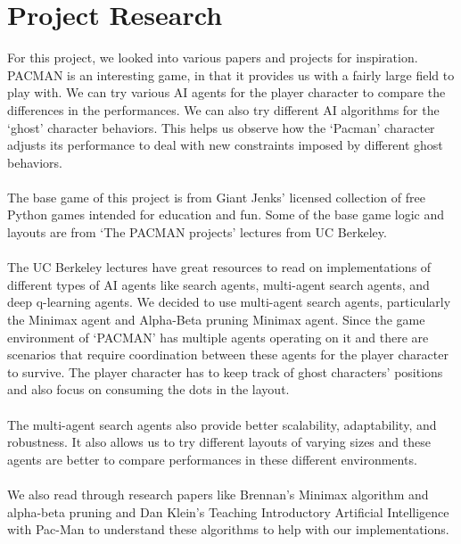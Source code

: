 \documentclass[letterpaper]{article} %
\begin{document}
\section{Project Research}
For this project, we looked into various papers and projects for inspiration. PACMAN is an interesting game, in that it provides us with a fairly large field to play with. We can try various AI agents for the player character to compare the differences in the performances. We can also try different AI algorithms for the ‘ghost’ character behaviors. This helps us observe how the ‘Pacman’ character adjusts its performance to deal with new constraints imposed by different ghost behaviors. \\ \\
The base game of this project is from Giant Jenks’ licensed collection of free Python games intended for education and fun. Some of the base game logic and layouts are from ‘The PACMAN projects’ lectures from UC Berkeley.  \\ \\
The UC Berkeley lectures have great resources to read on implementations of different types of AI agents like search agents, multi-agent search agents, and deep q-learning agents. We decided to use multi-agent search agents, particularly the Minimax agent and Alpha-Beta pruning Minimax agent. Since the game environment of ‘PACMAN’ has multiple agents operating on it and there are scenarios that require coordination between these agents for the player character to survive. The player character has to keep track of ghost characters’ positions and also focus on consuming the dots in the layout. \\ \\
The multi-agent search agents also provide better scalability, adaptability, and robustness.  It also allows us to try different layouts of varying sizes and these agents are better to compare performances in these different environments. \\ \\
We also read through research papers like Brennan's Minimax algorithm and alpha-beta pruning and Dan Klein's Teaching Introductory Artificial Intelligence with Pac-Man to understand these algorithms to help with our implementations. 
\end{document}
